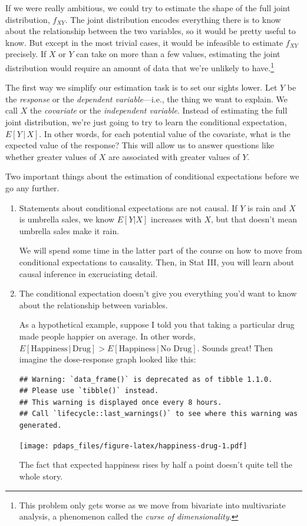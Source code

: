 \documentclass[
  12pt,
  oneside,openany]{book}
\begin{document}
If we were really ambitious, we could try to estimate the shape of the full joint distribution, \(f_{XY}\). The joint distribution encodes everything there is to know about the relationship between the two variables, so it would be pretty useful to know. But except in the most trivial cases, it would be infeasible to estimate \(f_{XY}\) precisely. If \(X\) or \(Y\) can take on more than a few values, estimating the joint distribution would require an amount of data that we're unlikely to have.\footnote{This problem only gets worse as we move from bivariate into multivariate analysis, a phenomenon called the \emph{curse of dimensionality}.}

The first way we simplify our estimation task is to set our sights lower. Let \(Y\) be the \emph{response} or the \emph{dependent variable}---i.e., the thing we want to explain. We call \(X\) the \emph{covariate} or the \emph{independent variable}. Instead of estimating the full joint distribution, we're just going to try to learn the conditional expectation, \(E[Y \,|\, X]\). In other words, for each potential value of the covariate, what is the expected value of the response? This will allow us to answer questions like whether greater values of \(X\) are associated with greater values of \(Y\).

Two important things about the estimation of conditional expectations before we go any further.

\begin{enumerate}
\def\labelenumi{\arabic{enumi}.}
\item
  Statements about conditional expectations are not causal. If \(Y\) is rain and \(X\) is umbrella sales, we know \(E[Y | X]\) increases with \(X\), but that doesn't mean umbrella sales make it rain.

  We will spend some time in the latter part of the course on how to move from conditional expectations to causality. Then, in Stat III, you will learn about causal inference in excruciating detail.
\item
  The conditional expectation doesn't give you everything you'd want to know about the relationship between variables.

  As a hypothetical example, suppose I told you that taking a particular drug made people happier on average. In other words, \(E[\text{Happiness} \,|\, \text{Drug}] > E[\text{Happiness} \,|\, \text{No Drug}]\). Sounds great! Then imagine the dose-response graph looked like this:

\begin{verbatim}
## Warning: `data_frame()` is deprecated as of tibble 1.1.0.
## Please use `tibble()` instead.
## This warning is displayed once every 8 hours.
## Call `lifecycle::last_warnings()` to see where this warning was generated.
\end{verbatim}

  \texttt{[image: pdaps\_files/figure-latex/happiness-drug-1.pdf]}

  The fact that expected happiness rises by half a point doesn't quite tell the whole story.
\end{enumerate}
\end{document}
